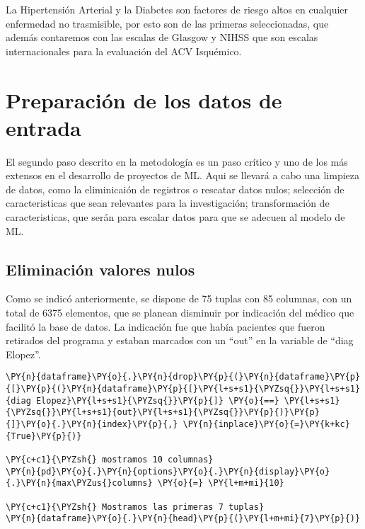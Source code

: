     La Hipertensión Arterial y la Diabetes son factores de riesgo altos en cualquier enfermedad no trasmisible, por esto son de las primeras seleccionadas, que además contaremos con las escalas de Glasgow y NIHSS que son escalas internacionales para la evaluación del ACV Isquémico.

    \hypertarget{preparaciuxf3n-de-los-datos-de-entrada}{%
\section{Preparación de los datos de
entrada}\label{preparaciuxf3n-de-los-datos-de-entrada}}

El segundo paso descrito en la metodología  es un paso crítico y uno de los más extensos en el desarrollo de proyectos de ML. Aqui se llevará a cabo una limpieza de datos, como la eliminicaión de registros o rescatar datos nulos; selección de caracteristicas que sean relevantes para la investigación; transformación de caracteristicas, que serán para escalar datos para que se adecuen al modelo de ML.

    \hypertarget{eliminaciuxf3n-las-filas-de-los-pacientes-que-se-expulsaron-de-la-bdd}{%
\subsection{Eliminación valores nulos}\label{eliminaciuxf3n-las-filas-de-los-pacientes-que-se-expulsaron-de-la-bdd}}

Como se indicó anteriormente, se dispone de 75 tuplas con 85 columnas, con un total de 6375 elementos, que se planean disminuir por indicación del médico que facilitó la base de datos. La indicación fue que había pacientes que fueron retirados del programa y estaban marcados con un ``out'' en la variable de ``diag Elopez''.

    \begin{tcolorbox}[breakable, size=fbox, boxrule=1pt, pad at break*=1mm,colback=cellbackground, colframe=cellborder]
\begin{Verbatim}[commandchars=\\\{\}]
\PY{n}{dataframe}\PY{o}{.}\PY{n}{drop}\PY{p}{(}\PY{n}{dataframe}\PY{p}{[}\PY{p}{(}\PY{n}{dataframe}\PY{p}{[}\PY{l+s+s1}{\PYZsq{}}\PY{l+s+s1}{diag Elopez}\PY{l+s+s1}{\PYZsq{}}\PY{p}{]} \PY{o}{==} \PY{l+s+s1}{\PYZsq{}}\PY{l+s+s1}{out}\PY{l+s+s1}{\PYZsq{}}\PY{p}{)}\PY{p}{]}\PY{o}{.}\PY{n}{index}\PY{p}{,} \PY{n}{inplace}\PY{o}{=}\PY{k+kc}{True}\PY{p}{)}

\PY{c+c1}{\PYZsh{} mostramos 10 columnas}
\PY{n}{pd}\PY{o}{.}\PY{n}{options}\PY{o}{.}\PY{n}{display}\PY{o}{.}\PY{n}{max\PYZus{}columns} \PY{o}{=} \PY{l+m+mi}{10}

\PY{c+c1}{\PYZsh{} Mostramos las primeras 7 tuplas}
\PY{n}{dataframe}\PY{o}{.}\PY{n}{head}\PY{p}{(}\PY{l+m+mi}{7}\PY{p}{)}
\end{Verbatim}
\end{tcolorbox}


